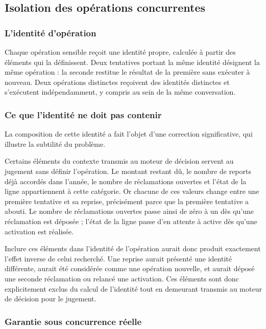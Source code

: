 \subsection{Isolation des opérations concurrentes}

\subsubsection{L'identité d'opération}

Chaque opération sensible reçoit une identité propre, calculée à partir des éléments qui la définissent. Deux tentatives portant la même identité désignent la même opération : la seconde restitue le résultat de la première sans exécuter à nouveau. Deux opérations distinctes reçoivent des identités distinctes et s'exécutent indépendamment, y compris au sein de la même conversation.

\subsubsection{Ce que l'identité ne doit pas contenir}

La composition de cette identité a fait l'objet d'une correction significative, qui illustre la subtilité du problème.

Certains éléments du contexte transmis au moteur de décision servent au jugement sans définir l'opération. Le montant restant dû, le nombre de reports déjà accordés dans l'année, le nombre de réclamations ouvertes et l'état de la ligne appartiennent à cette catégorie. Or chacune de ces valeurs change entre une première tentative et sa reprise, précisément parce que la première tentative a abouti. Le nombre de réclamations ouvertes passe ainsi de zéro à un dès qu'une réclamation est déposée ; l'état de la ligne passe d'en attente à active dès qu'une activation est réalisée.

Inclure ces éléments dans l'identité de l'opération aurait donc produit exactement l'effet inverse de celui recherché. Une reprise aurait présenté une identité différente, aurait été considérée comme une opération nouvelle, et aurait déposé une seconde réclamation ou relancé une activation. Ces éléments sont donc explicitement exclus du calcul de l'identité tout en demeurant transmis au moteur de décision pour le jugement.

\subsubsection{Garantie sous concurrence réelle}


